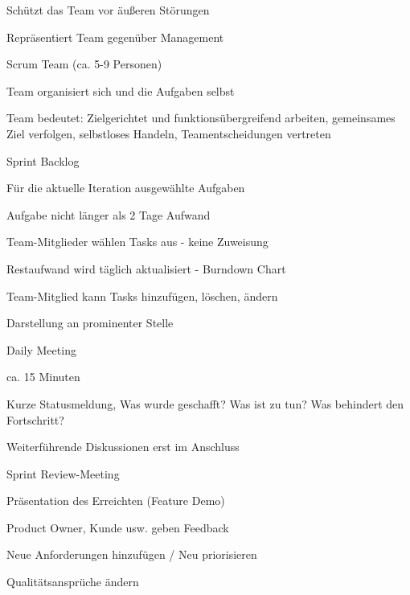\documentclass[a4paper]{article}
\begin{document}
\begin{multicols}{3}
\begin{itemize*}
\begin{itemize*}
\begin{itemize*}
                    \item Schützt das Team vor äußeren Störungen
                    \item Repräsentiert Team gegenüber Management
                  \end{itemize*}
            \item Scrum Team (ca. 5-9 Personen)
                  \begin{itemize*}
                    \item Team organisiert sich und die Aufgaben selbst
                    \item Team bedeutet: Zielgerichtet und funktionsübergreifend arbeiten, gemeinsames Ziel verfolgen, selbstloses Handeln, Teamentscheidungen vertreten
                  \end{itemize*}
          \end{itemize*}
  \end{itemize*}

  Sprint Backlog
  \begin{itemize*}
    \item Für die aktuelle Iteration ausgewählte Aufgaben
          \begin{itemize*}
            \item Aufgabe nicht länger als 2 Tage Aufwand
          \end{itemize*}
    \item Team-Mitglieder wählen Tasks aus - keine Zuweisung
    \item Restaufwand wird täglich aktualisiert - Burndown Chart
    \item Team-Mitglied kann Tasks hinzufügen, löschen, ändern
    \item Darstellung an prominenter Stelle
  \end{itemize*}

  Daily Meeting
  \begin{itemize*}
    \item ca. 15 Minuten
    \item Kurze Statusmeldung, Was wurde geschafft? Was ist zu tun? Was behindert den Fortschritt?
    \item Weiterführende Diskussionen erst im Anschluss
  \end{itemize*}


  Sprint Review-Meeting
  \begin{itemize*}
    \item Präsentation des Erreichten (Feature Demo)
    \item Product Owner, Kunde usw. geben Feedback
          \begin{itemize*}
            \item Neue Anforderungen hinzufügen / Neu priorisieren
            \item Qualitätsansprüche ändern
          \end{itemize*}
  \end{itemize*}


\end{multicols}
\end{document}
